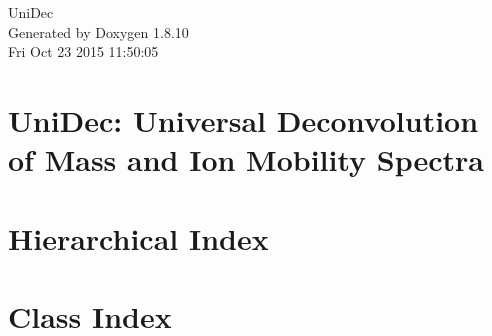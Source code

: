 \documentclass[twoside]{book}
\newcommand{\+}{\discretionary{\mbox{\scriptsize$\hookleftarrow$}}{}{}}
\newcommand{\clearemptydoublepage}{%
  \newpage{\pagestyle{empty}\cleardoublepage}%
}
\begin{document}
\hypersetup{pageanchor=false,
             bookmarks=true,
             bookmarksnumbered=true,
             pdfencoding=unicode
            }
\begin{titlepage}
\vspace*{7cm}
\begin{center}%
{\Large Uni\+Dec }\\
\vspace*{1cm}
{\large Generated by Doxygen 1.8.10}\\
\vspace*{0.5cm}
{\small Fri Oct 23 2015 11:50:05}\\
\end{center}
\end{titlepage}
\clearemptydoublepage
\tableofcontents
\clearemptydoublepage
{}
\hypersetup{pageanchor=true}

\chapter{Uni\+Dec\+: Universal Deconvolution of Mass and Ion Mobility Spectra}
\label{index}\hypertarget{index}{}
\chapter{Hierarchical Index}

\chapter{Class Index}

\end{document}
